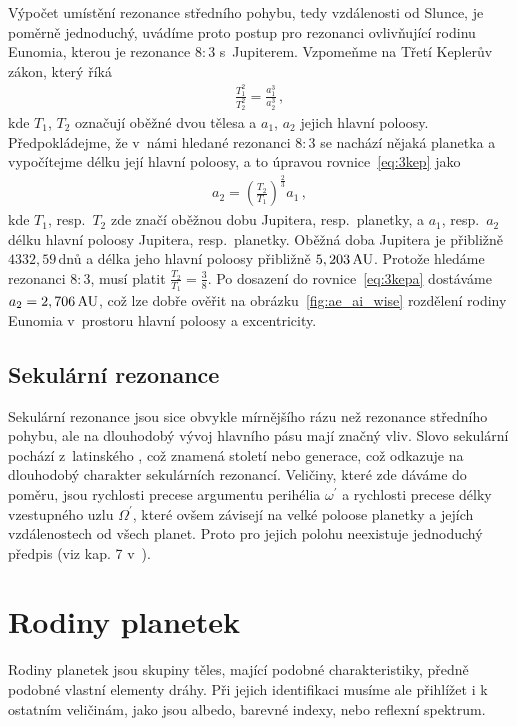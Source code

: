 \documentclass[A4paper, 12pt, oneside]{book}
\begin{document}
Výpočet umístění rezonance středního pohybu, tedy vzdálenosti od Slunce, je poměrně jednoduchý, uvádíme proto postup pro rezonanci ovlivňující rodinu Eunomia, kterou je rezonance $8:3$ s~Jupiterem. Vzpomeňme na Třetí Keplerův zákon, který říká
\begin{align} \label{eq:3kep}
	\frac{T_1^2}{T_2^2}=\frac{a_1^3}{a_2^3}\,, 
\end{align}
kde $T_1$, $T_2$ označují oběžné dvou tělesa a $a_1$, $a_2$ jejich hlavní poloosy. Předpokládejme, že v~námi hledané rezonanci $8:3$ se nachází nějaká planetka a vypočítejme délku její hlavní poloosy, a to úpravou rovnice~\eqref{eq:3kep} jako
\begin{align} \label{eq:3kepa}
	a_2=\left(\frac{T_2}{T_1}\right)^{\frac{2}{3}}a_1\,,
\end{align}
kde $T_1$, resp.\ $T_2$ zde značí oběžnou dobu Jupitera, resp.\ planetky, a $a_1$, resp.\ $a_2$ délku hlavní poloosy Jupitera, resp.\ planetky. Oběžná doba Jupitera je přibližně $4332,59\,$dnů a délka jeho hlavní poloosy přibližně $5,203\,{\rm AU}$. Protože hledáme rezonanci $8:3$, musí platit $\frac{T_2}{T_1}=\frac{3}{8}$. Po dosazení do rovnice~\eqref{eq:3kepa} dostáváme $a_2=2,706\,{\rm AU}$, což lze dobře ověřit na obrázku~\ref{fig:ae_ai_wise} rozdělení rodiny Eunomia v~prostoru hlavní poloosy a excentricity.
\subsection{Sekulární rezonance} 
Sekulární rezonance jsou sice obvykle mírnějšího rázu než rezonance středního pohybu, ale na dlouhodobý vývoj hlavního pásu mají značný vliv. Slovo sekulární pochází z~latinského , což znamená století nebo generace, což odkazuje na dlouhodobý charakter sekulárních rezonancí. Veličiny, které zde dáváme do poměru, jsou rychlosti precese argumentu perihélia $\omega^\prime$ a rychlosti precese délky vzestupného uzlu $\Omega^\prime$, které ovšem závisejí na velké poloose planetky a jejích vzdálenostech od všech planet. Proto pro jejich polohu neexistuje jednoduchý předpis (viz kap. 7 v~\cite{murray00}).

\pagebreak
\section{Rodiny planetek}

Rodiny planetek jsou skupiny těles, mající podobné charakteristiky, předně podobné vlastní elementy dráhy. Při jejich identifikaci musíme ale přihlížet i k ostatním veličinám, jako jsou albedo, barevné indexy, nebo reflexní spektrum. 
\end{document}
